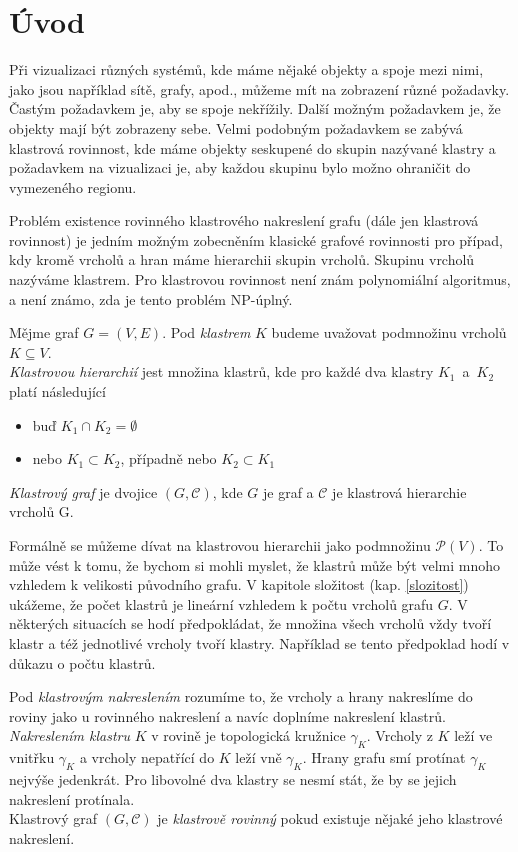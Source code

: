 \chapter{Úvod}

Při vizualizaci různých systémů, kde máme nějaké objekty a spoje mezi nimi, jako jsou například sítě, grafy, apod., můžeme mít na zobrazení různé požadavky. Častým požadavkem je, aby se spoje nekřížily. Další možným požadavkem je, že objekty mají být zobrazeny  sebe. Velmi podobným požadavkem se zabývá klastrová rovinnost, kde máme objekty seskupené do skupin nazývané klastry a požadavkem na vizualizaci je, aby každou skupinu bylo možno ohraničit do vymezeného regionu.

Problém existence rovinného klastrového nakreslení grafu (dále jen klastrová rovinnost) je jedním možným zobecněním klasické grafové rovinnosti pro případ, kdy kromě vrcholů a hran máme hierarchii skupin vrcholů. Skupinu vrcholů nazýváme klastrem. Pro klastrovou rovinnost není znám polynomiální algoritmus, a není známo, zda je tento problém NP-úplný. 

\begin{defn}
Mějme graf $G=(V,E)$. Pod \textit{klastrem} $K$ budeme uvažovat podmnožinu vrcholů  $K \subseteq V$. \\
\textit{Klastrovou hierarchií} jest množina klastrů, kde pro každé dva klastry $K_1$~a~$K_2$ platí následující
\begin{itemize}
\item buď $K_1 \cap K_2 = \emptyset$
\item nebo $K_1 \subset K_2$, případně nebo $K_2 \subset K_1$
\end{itemize}
\textit{Klastrový graf} je dvojice $(G,\mathcal C)$, kde $G$ je graf a $\mathcal C$ je klastrová hierarchie vrcholů G.
\end{defn}

Formálně se můžeme dívat na klastrovou hierarchii jako podmnožinu $\mathcal P (V)$. To může vést k tomu, že bychom si mohli myslet, že klastrů může být velmi mnoho vzhledem k velikosti původního grafu. V kapitole složitost (kap. \ref{slozitost}) ukážeme, že počet klastrů je lineární vzhledem k počtu vrcholů grafu $G$. V některých situacích se hodí předpokládat, že množina všech vrcholů vždy tvoří klastr a též jednotlivé vrcholy tvoří klastry. Například se tento předpoklad  hodí v důkazu o počtu klastrů.

\begin{defn}
Pod \textit{klastrovým nakreslením} rozumíme to, že vrcholy a hrany nakreslíme do roviny jako u rovinného nakreslení a navíc doplníme nakreslení klastrů.\\ 
\textit{Nakreslením klastru} $K$ v rovině je topologická kružnice $\gamma_K$. Vrcholy z $K$ leží ve vnitřku $\gamma_K$ a vrcholy nepatřící do $K$ leží vně $\gamma_K$. Hrany grafu smí protínat $\gamma_K$ nejvýše jedenkrát. Pro libovolné dva klastry se nesmí stát, že by se jejich nakreslení protínala.\\
Klastrový graf $(G,\mathcal C)$ je \textit{klastrově rovinný} pokud existuje nějaké jeho klastrové nakreslení.
\end{defn}

